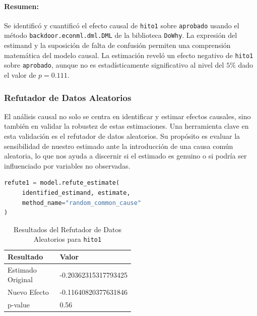 \paragraph{Resumen:}
Se identificó y cuantificó el efecto causal de \texttt{hito1} sobre \texttt{aprobado} usando el método \texttt{backdoor.econml.dml.DML} de la biblioteca \texttt{DoWhy}. La expresión del estimand y la suposición de falta de confusión permiten una comprensión matemática del modelo causal. La estimación reveló un efecto negativo de \texttt{hito1} sobre \texttt{aprobado}, aunque no es estadísticamente significativo al nivel del \(5\%\) dado el valor de \( p = 0.111 \). 


\subsubsection{Refutador de Datos Aleatorios}

El análisis causal no solo se centra en identificar y estimar efectos causales, sino también en validar la robustez de estas estimaciones. Una herramienta clave en esta validación es el refutador de datos aleatorios. Su propósito es evaluar la sensibilidad de nuestro estimado ante la introducción de una causa común aleatoria, lo que nos ayuda a discernir si el estimado es genuino o si podría ser influenciado por variables no observadas.

\begin{minipage}{0.5\textwidth}
    \begin{lstlisting}[language=Python, caption=Refutador de datos aleatorios para \texttt{hito1}, label=lst:RefutadorDatosAleatoriosHito1]
refute1 = model.refute_estimate(
     identified_estimand, estimate, 
     method_name="random_common_cause"
)
\end{lstlisting}
\end{minipage}
\hfill
\begin{minipage}{0.45\textwidth}
    \begin{table}[H]
        \centering        
        \begin{tabular}{lp{0.5\linewidth}}
            \toprule
            \textbf{Resultado} & \textbf{Valor} \\
            \midrule
            Estimado Original & -0.20362315317793425 \\
            Nuevo Efecto & -0.11640820377631846 \\
            p-value & 0.56 \\
            \bottomrule
        \end{tabular}
        \caption{Resultados del Refutador de Datos Aleatorios para \texttt{hito1}}
        \label{tab:refutador_datos_aleatorios_hito1}
    \end{table}
\end{minipage}

